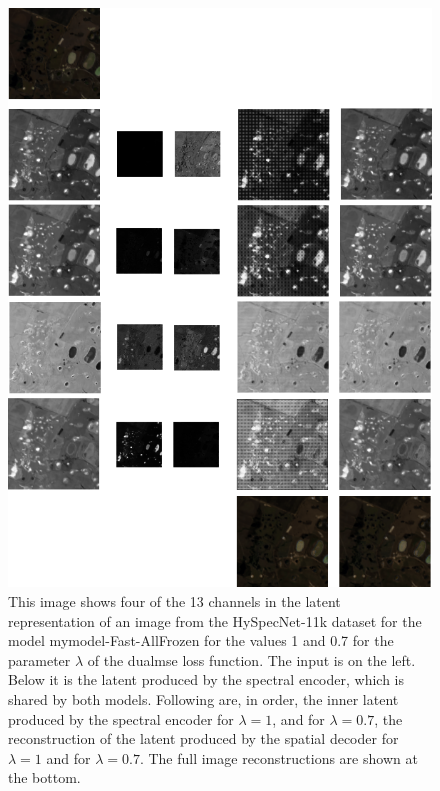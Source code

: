 \begin{figure}
\centering
\includegraphics[scale=0.6]{img/latents_2.png}
\caption[Latent Representations]{This image shows four of the 13 channels in the latent representation of an image from the HySpecNet-11k dataset for the model \ac{mymodel}-Fast-AllFrozen for the values 1 and 0.7 for the parameter $\lambda$ of the \ac{dualmse} loss function. The input is on the left. Below it is the latent produced by the spectral encoder, which is shared by both models. Following are, in order, the inner latent produced by the spectral encoder for $\lambda=1$, and for  $\lambda=0.7$, the reconstruction of the latent produced by the spatial decoder for $\lambda=1$ and for $\lambda=0.7$. The full image reconstructions are shown at the bottom.}
\label{fig:latentcompare}
\end{figure}

